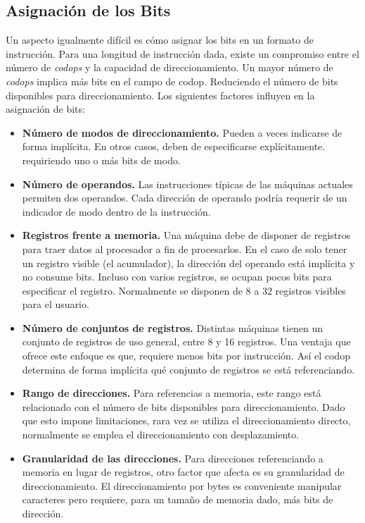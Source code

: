 \documentclass{article}
\begin{document}
\subsection*{Asignaci\'{o}n de los Bits}
Un aspecto igualmente dif\'{i}cil es c\'{o}mo asignar los bits en un formato de
instrucci\'{o}n. Para una longitud de instrucci\'{o}n dada, existe un compromiso
entre el n\'{u}mero de \textit{codops} y la capacidad de direccionamiento. Un
mayor n\'{u}mero de \textit{codops} implica m\'{a}s bits en el campo de codop.
Reduciendo el n\'{u}mero de bits disponibles para direccionamiento. Los siguientes
factores influyen en la asignaci\'{o}n de bits:

\begin{itemize}
    \item \textbf{N\'{u}mero de modos de direccionamiento.}
          Pueden a veces indicarse de forma impl\'{i}cita. En otros casos,
          deben de especificarse expl\'{i}citamente. requiriendo uno o m\'{a}s
          bits de modo.
    \item \textbf{N\'{u}mero de operandos.}
          Las instrucciones t\'{i}picas de las m\'{a}quinas actuales permiten
          dos operandos. Cada direcci\'{o}n de operando podr\'{i}a requerir de un
          indicador de modo dentro de la instrucci\'{o}n.
    \item \textbf{Registros frente a memoria.}
          Una m\'{a}quina debe de disponer de registros para traer datos al
          procesador a fin de procesarlos. En el caso de solo tener un registro
          visible (el acumulador), la direcci\'{o}n del operando est\'{a}
          impl\'{i}cita y no consume bits. Incluso con varios registros, se ocupan
          pocos bits para especificar el registro. Normalmente se disponen de
          8 a 32 registros visibles para el usuario.
    \item \textbf{N\'{u}mero de conjuntos de registros.}
          Distintas m\'{a}quinas tienen un conjunto de registros de uso general,
          entre 8 y 16 registros. Una ventaja que ofrece este enfoque es que,
          requiere menos bits por instrucci\'{o}n. As\'{i} el codop determina
          de forma impl\'{i}cita qu\'{e} conjunto de registros se est\'{a}
          referenciando.
    \item \textbf{Rango de direcciones.}
          Para referencias a memoria, este rango est\'{a} relacionado con el
          n\'{u}mero de bits disponibles para direccionamiento. Dado que esto
          impone limitaciones, rara vez se utiliza el direccionamiento directo,
          normalmente se emplea el direccionamiento con desplazamiento.
    \item \textbf{Granularidad de las direcciones.}
          Para direcciones referenciando a memoria en lugar de registros, otro factor
          que afecta es su granularidad de direccionamiento. El direccionamiento por
          bytes es conveniente manipular caracteres pero requiere, para un tama\~{n}o
          de memoria dado, m\'{a}s bits de direcci\'{o}n.
\end{itemize}
\end{document}
